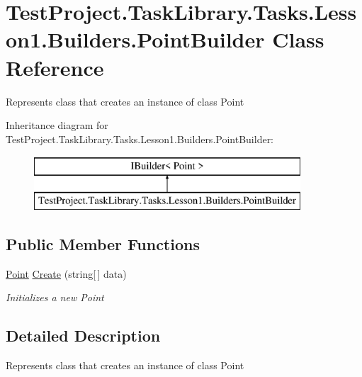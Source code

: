 \hypertarget{class_test_project_1_1_task_library_1_1_tasks_1_1_lesson1_1_1_builders_1_1_point_builder}{}\section{Test\+Project.\+Task\+Library.\+Tasks.\+Lesson1.\+Builders.\+Point\+Builder Class Reference}
\label{class_test_project_1_1_task_library_1_1_tasks_1_1_lesson1_1_1_builders_1_1_point_builder}


Represents class that creates an instance of class Point  


Inheritance diagram for Test\+Project.\+Task\+Library.\+Tasks.\+Lesson1.\+Builders.\+Point\+Builder\+:\begin{figure}[H]
\begin{center}
\leavevmode
\includegraphics[height=2.000000cm]{class_test_project_1_1_task_library_1_1_tasks_1_1_lesson1_1_1_builders_1_1_point_builder}
\end{center}
\end{figure}
\subsection*{Public Member Functions}
\begin{DoxyCompactItemize}
\item 
\mbox{\hyperlink{class_test_project_1_1_task_library_1_1_tasks_1_1_lesson1_1_1_models_1_1_point}{Point}} \mbox{\hyperlink{class_test_project_1_1_task_library_1_1_tasks_1_1_lesson1_1_1_builders_1_1_point_builder_a40d3db3ed5e3d9619181995f9614a6ee}{Create}} (string\mbox{[}$\,$\mbox{]} data)
\begin{DoxyCompactList}\small\item\em Initializes a new Point \end{DoxyCompactList}\end{DoxyCompactItemize}


\subsection{Detailed Description}
Represents class that creates an instance of class Point 



